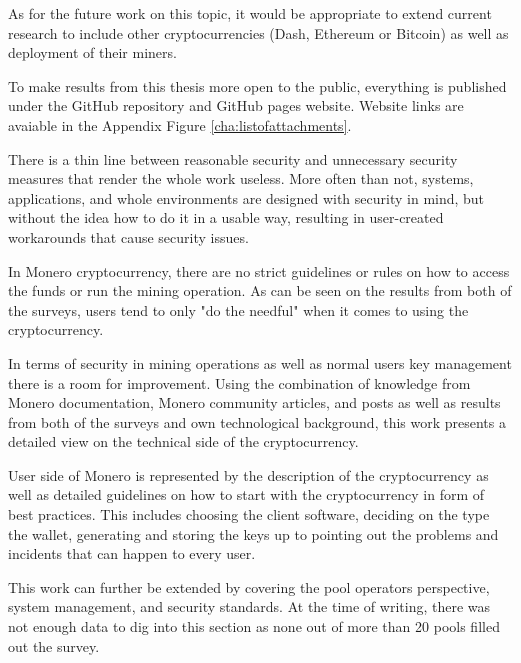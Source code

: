 \documentclass[
  printed, %
  table,   %
  lof,     %
  lot,     %
           oneside, color
]{fithesis3}
\begin{document}
As for the future work on this topic, it would be appropriate to extend current research to include other cryptocurrencies (Dash, Ethereum or Bitcoin) as well as deployment of their miners. 

To make results from this thesis more open to the public, everything is published under the GitHub repository and GitHub pages website. Website links are avaiable in the Appendix Figure \ref{cha:listofattachments}.





\iffalse There is a thin line between reasonable security and unnecessary security measures that render the whole work useless. More often than not, systems, applications, and whole environments are designed with security in mind, but without the idea how to do it in a usable way, resulting in user-created workarounds that cause security issues.

In Monero cryptocurrency, there are no strict guidelines or rules on how to access the funds or run the mining operation. As can be seen on the results from both of the surveys, users tend to only "do the needful" when it comes to using the cryptocurrency.


In terms of security in mining operations as well as normal users key management there is a room for improvement. Using the combination of knowledge from  Monero documentation, Monero community articles, and posts as well as results from both of the surveys and own technological background, this work presents a detailed view on the technical side of the cryptocurrency.

User side of Monero is represented by the description of the cryptocurrency as well as detailed guidelines on how to start with the cryptocurrency in form of best practices. This includes choosing the client software, deciding on the type the wallet, generating and storing the keys up to pointing out the problems and incidents that can happen to every user.

This work can further be extended by covering the pool operators perspective,  system management, and security standards. At the time of writing, there was not enough data to dig into this section as none out of more than 20 pools filled out the survey.
\end{document}
